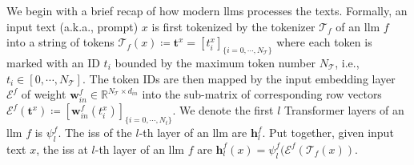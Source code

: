 \documentclass[letterpaper,twocolumn,10pt]{article}
\newcommand{\tokenizer}{\cT}
\newcommand{\tokenstring}{\mathbf{t}}
\newcommand{\llm}{f}
\newcommand{\transformer}{\psi}
\newcommand{\firstlayer}[2]{\transformer^{#1}_{#2}}
\newcommand{\interstates}[2]{\bh^{#1}_{#2}}
\newcommand{\inpemb}[1]{\cE^{#1}}
\newcommand{\inpembmat}[1]{\bw_{in}^{#1}}
\newcommand{\inpembdim}{d_{in}}
\newcommand{\maxtokennum}{N_\tokenizer}
\newcommand{\inputtext}{x}
\newcommand{\ie}{\hbox{{i.e.}}\xspace}
\newcommand{\aka}{\hbox{{a.k.a.}}\xspace}
\newcommand{\bh}{\mathbf{h}}
\newcommand{\bw}{\mathbf{w}}
\newcommand{\cE}{\mathcal{E}}
\newcommand{\cT}{\mathcal{T}}
\newcommand{\Real}{\mathbb{R}}
\theoremstyle{definition}
\begin{document}
We begin with a brief recap of how modern \acp{llm} processes the texts. Formally, an input text (\aka, prompt) $\inputtext$ is first tokenized by the tokenizer $\tokenizer_\llm$ of an \ac{llm} $\llm$ into a string of tokens $\tokenizer_\llm(x)\coloneq \tokenstring^x=[t_i^x]_{\{i=0,\cdots, \maxtokennum\}}$ where each token is marked with an ID $t_i$ bounded by the maximum token number $\maxtokennum$, \ie, $t_i\in[0,\cdots,\maxtokennum]$.
The token IDs are then mapped by the input embedding layer $\inpemb{\llm}$ of weight $\inpembmat{\llm}\in\Real^{\maxtokennum \times \inpembdim}$ into the sub-matrix of corresponding row vectors $\inpemb{\llm}(\tokenstring^x)\coloneq [\inpembmat{\llm}(t_i^x)]_{\{i=0,\cdots, N_t\}}$.
We denote the first $l$ Transformer layers of an \ac{llm} $\llm$ is $\firstlayer{\llm}{l}$.
The \acp{is} of the $l$-th layer of an \ac{llm} are $\interstates{\llm}{l}$.
Put together, given input text $x$, the \acp{is} at $l$-th layer of an \ac{llm} $\llm$ are $\interstates{\llm}{l}(x)=\firstlayer{\llm}{l}(\inpemb{\llm}(\tokenizer_\llm(x))$.
\end{document}
